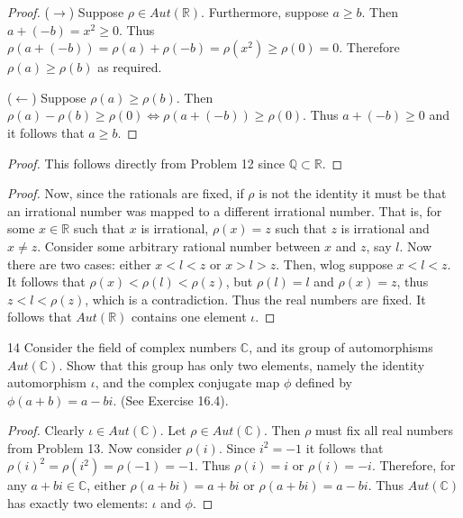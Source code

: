 \begin{proof}
    ($\longrightarrow$)
    Suppose $\rho \in Aut(\mathbb{R})$.
    Furthermore, suppose $a \ge b$.
    Then $a + (-b) = x^2 \ge 0$.
    Thus $\rho(a + (-b)) = \rho(a) + \rho(-b) = \rho(x^2) \ge \rho(0) = 0$.
    Therefore $\rho(a) \ge \rho(b)$ as required.

    ($\longleftarrow$) Suppose $\rho(a) \ge \rho(b)$.
    Then $\rho(a) - \rho(b) \ge \rho(0) \iff \rho(a + (-b)) \ge \rho(0)$.
    Thus $a + (-b) \ge 0$ and it follows that $a \ge b$.
\end{proof}

\begin{proof}
    This follows directly from Problem 12 since $\mathbb{Q} \subset \mathbb{R}$.
\end{proof}

\begin{proof}
    Now, since the rationals are fixed, if $\rho$ is not the identity it 
        must be that an irrational number was mapped to a different irrational number.
    That is, for some $x \in \mathbb{R}$ such that $x$ is irrational,
        $\rho(x) = z$ such that $z$ is irrational and $x \ne z$.
    Consider some arbitrary rational number between $x$ and $z$, say $l$.
    Now there are two cases: either $x < l < z$ or $x > l > z$.
    Then, wlog suppose $x < l < z$.
    It follows that $\rho(x) < \rho(l) < \rho(z)$, but $\rho(l) = l$ and $\rho(x) = z$,
    thus $z < l < \rho(z)$, which is a contradiction.
    Thus the real numbers are fixed.
    It follows that $Aut(\mathbb{R})$ contains one element $\iota$.
\end{proof}

\begin{problem}{14}
    Consider the field of complex numbers $\mathbb{C}$, and its group of automorphisms
    $Aut(\mathbb{C})$. Show that this group has only two elements,
    namely the identity automorphism $\iota$, and the 
    complex conjugate map $\phi$ defined by $\phi(a + b) = a - bi$.
    (See Exercise 16.4).
\end{problem}
\solved

\begin{proof}
    Clearly $\iota \in Aut(\mathbb{C})$.  
    Let $\rho \in Aut(\mathbb{C})$.  
    Then $\rho$ must fix all real numbers from Problem 13.  
    Now consider $\rho(i)$. Since $i^2 = -1$ it follows that $\rho(i)^2 = \rho(i^2) = \rho(-1) = -1$.  
    Thus $\rho(i) = i$ or $\rho(i) = -i$.  
    Therefore, for any $a + bi \in \mathbb{C}$, either $\rho(a + bi) = a + bi$ or $\rho(a + bi) = a - bi$.  
    Thus $Aut(\mathbb{C})$ has exactly two elements: $\iota$ and $\phi$.
\end{proof}

